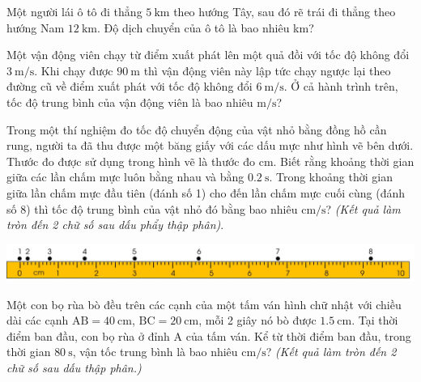 \begin{ex}
	Một người lái ô tô đi thẳng $\SI{5}{\kilo\meter}$ theo hướng Tây, sau đó rẽ trái đi thẳng theo hướng Nam $\SI{12}{\kilo\meter}$. Độ dịch chuyển của ô tô là bao nhiêu \si{\kilo\meter}?
\end{ex}
\begin{ex}
	Một vận động viên chạy từ điểm xuất phát lên một quả đồi với tốc độ không đổi $\SI{3}{\meter/\second}$. Khi chạy được $\SI{90}{\meter}$ thì vận động viên này lập tức chạy ngược lại theo đường cũ về điểm xuất phát với tốc độ không đổi $\SI{6}{\meter/\second}$. Ở cả hành trình trên, tốc độ trung bình của vận động viên là bao nhiêu $\si{\meter/\second}$?
\end{ex}
\begin{ex}
	Trong một thí nghiệm đo tốc độ chuyển động của vật nhỏ bằng đồng hồ cần rung, người ta đã thu được một băng giấy với các dấu mực như hình vẽ bên dưới. Thước đo được sử dụng trong hình vẽ là thước đo $\si{\centi\meter}$. Biết rằng khoảng thời gian giữa các lần chấm mực luôn bằng nhau và bằng $\SI{0.2}{\second}$. Trong khoảng thời gian giữa lần chấm mực đầu tiên (đánh số 1) cho đến lần chấm mực cuối cùng (đánh số 8) thì tốc độ trung bình của vật nhỏ đó bằng bao nhiêu $\si{\centi\meter/\second}$?	\textit{(Kết quả làm tròn đến 2 chữ số sau dấu phẩy thập phân)}.
	\begin{center}
		\includegraphics[scale=0.5]{figs/G10Y25B3-41}
	\end{center}
\end{ex}
\begin{ex}
	Một con bọ rùa bò đều trên các cạnh của một tấm ván hình chữ nhật với chiều dài các cạnh $\mathrm{AB}=\SI{40}{\centi\meter}$, $\mathrm{BC}=\SI{20}{\centi\meter}$, mỗi 2 giây nó bò được $\SI{1.5}{\centi\meter}$. Tại thời điểm ban đầu, con bọ rùa ở đỉnh A của tấm ván. Kể từ thời điểm ban đầu, trong thời gian $\SI{80}{\second}$, vận tốc trung bình là bao nhiêu $\si{\centi\meter/\second}$? \textit{(Kết quả làm tròn đến 2 chữ số sau dấu thập phân.)}
\end{ex}
